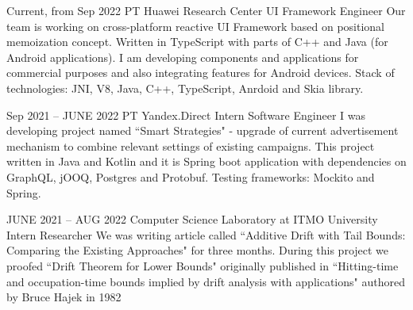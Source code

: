 \documentclass[
	10pt, %
]{FreemanCV}
\begin{document}
\begin{paracol}{2}

\jobentry
	{Current, from Sep 2022} %
	{PT} %
	{Huawei Research Center} %
	{UI Framework Engineer} %
	{Our team is working on cross-platform reactive UI Framework based on positional memoization concept. Written in TypeScript with parts of C++ and Java (for Android applications). I am developing components and applications for commercial purposes and also integrating features for Android devices. Stack of technologies: JNI, V8, Java, C++, TypeScript, Anrdoid and Skia library. } %


\jobentry
	{Sep 2021 -- JUNE 2022} %
	{PT} %
	{Yandex.Direct} %
	{Intern Software Engineer} %
	{I was developing project named ``Smart Strategies" - upgrade of current advertisement mechanism to combine relevant settings of existing campaigns. This project written in Java and Kotlin and it is Spring boot application with dependencies on GraphQL, jOOQ, Postgres and Protobuf. Testing frameworks: Mockito and Spring.} %

 \jobentry
	{JUNE 2021 -- AUG 2022} %
	{} %
	{Computer Science Laboratory at ITMO University} %
	{Intern Researcher} %
	{We was writing article called ``Additive Drift with Tail Bounds: Comparing the Existing Approaches" for three months. During this project we proofed ``Drift Theorem for Lower Bounds" originally published in ``Hitting-time and occupation-time bounds implied by drift analysis with applications" authored by Bruce Hajek in 1982} %





	


\end{paracol}
\end{document}

